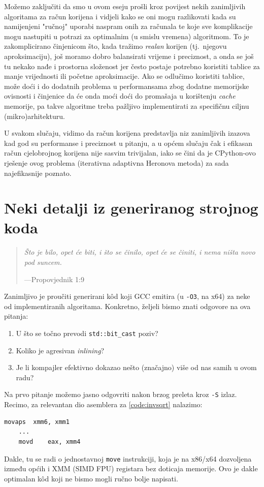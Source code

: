 \documentclass[12pt]{scrartcl}
\newcommand{\citat}[2]{\begin{quotation}\textit{#1}\vspace{-1em}\begin{flushright}---#2\end{flushright}\end{quotation}}
\begin{document}
Možemo zaključiti da smo u ovom eseju prošli kroz povijest nekih zanimljivih algoritama za račun korijena i vidjeli kako se oni mogu razlikovati
kada su namijenjeni "ručnoj" uporabi naspram onih za računala te koje sve komplikacije mogu nastupiti u potrazi za optimalnim
(u smislu vremena) algoritmom. To je
zakomplicirano činjenicom što, kada tražimo \emph{realan} korijen (tj.\ njegovu aproksimaciju), još moramo dobro balansirati vrijeme i preciznost, a
onda se još tu nekako nađe i prostorna složenost jer često postaje potrebno koristiti tablice za manje vrijednosti ili početne aproksimacije.
Ako se odlučimo koristiti tablice, može doći i do dodatnih problema u performansama zbog dodatne memorijske ovisnosti i činjenice da će onda
moći doći do promašaja u korištenju \textsl{cache} memorije, pa takve algoritme treba pažljivo implementirati za specifičnu ciljnu (mikro)arhitekturu.

U svakom slučaju, vidimo da račun korijena predstavlja niz zanimljivih izazova kad god su performanse i preciznost u pitanju, a u općem slučaju čak i
efikasan račun cjelobrojnog korijena nije sasvim trivijalan, iako se čini da je CPython-ovo rješenje ovog problema (iterativna adaptivna Heronova
metoda) za sada najefikasnije poznato.

\appendix
\section{Neki detalji iz generiranog strojnog koda}
\citat{Što je bilo, opet će biti, i što se činilo, opet će se činiti, i nema ništa novo pod suncem.}{Propovjednik 1:9}
Zanimljivo je proučiti generirani k\^od koji GCC emitira
 (u \verb|-O3|, na x64) za neke od implementiranih algoritama. Konkretno, željeli bismo znati odgovore na ova pitanja:
\begin{enumerate}
    \item U što se točno prevodi \verb|std::bit_cast| poziv?
    \item Koliko je agresivan \textsl{inlining}?
    \item Je li kompajler efektivno dokazao nešto (značajno) više od nas samih u ovom radu?
\end{enumerate}
Na prvo pitanje možemo jasno odgovriti nakon brzog preleta kroz \verb|-S| izlaz. Recimo, za relevantan dio asemblera za \autoref{code:invsqrt}
nalazimo:
\begin{lstlisting}[label=code:asm1]
	movaps	xmm6, xmm1
	...
	movd	eax, xmm4
\end{lstlisting}
Dakle, tu se radi o jednostavnoj \verb|move| instrukciji, koja je na x86/x64 dozvoljena između općih i XMM (SIMD FPU) registara bez doticaja
memorije. Ovo je dakle
optimalan k\^od koji ne bismo mogli ručno bolje napisati.
\end{document}
